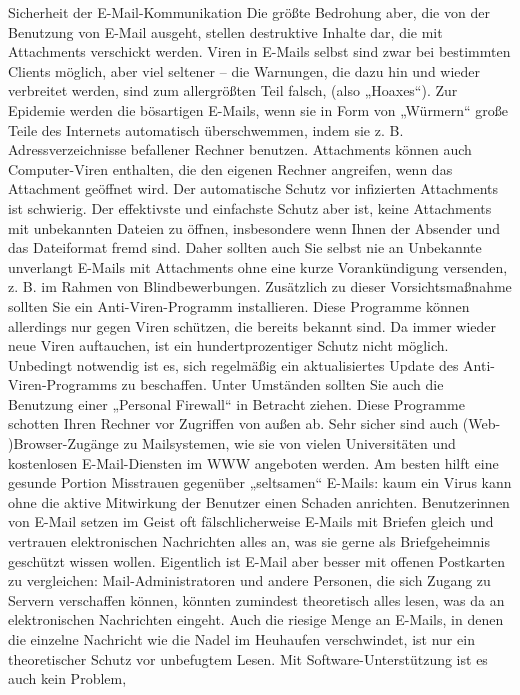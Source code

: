 \documentclass[]{book}
\theoremstyle{definition}
\theoremstyle{definition}
\theoremstyle{definition}
\theoremstyle{remark}
\begin{document}
Sicherheit der E-Mail-Kommunikation Die größte Bedrohung aber, die von
der Benutzung von E-Mail ausgeht, stellen destruktive Inhalte dar, die
mit Attachments verschickt werden. Viren in E-Mails selbst sind zwar bei
bestimmten Clients möglich, aber viel seltener -- die Warnungen, die
dazu hin und wieder verbreitet werden, sind zum allergrößten Teil
falsch, (also „Hoaxes``). Zur Epidemie werden die bösartigen E-Mails,
wenn sie in Form von „Würmern`` große Teile des Internets automatisch
überschwemmen, indem sie z. B. Adressverzeichnisse befallener Rechner
benutzen. Attachments können auch Computer-Viren enthalten, die den
eigenen Rechner angreifen, wenn das Attachment geöffnet wird. Der
automatische Schutz vor infizierten Attachments ist schwierig. Der
effektivste und einfachste Schutz aber ist, keine Attachments mit
unbekannten Dateien zu öffnen, insbesondere wenn Ihnen der Absender und
das Dateiformat fremd sind. Daher sollten auch Sie selbst nie an
Unbekannte unverlangt E-Mails mit Attachments ohne eine kurze
Vorankündigung versenden, z. B. im Rahmen von Blindbewerbungen.
Zusätzlich zu dieser Vorsichtsmaßnahme sollten Sie ein
Anti-Viren-Programm installieren. Diese Programme können allerdings nur
gegen Viren schützen, die bereits bekannt sind. Da immer wieder neue
Viren auftauchen, ist ein hundertprozentiger Schutz nicht möglich.
Unbedingt notwendig ist es, sich regelmäßig ein aktualisiertes Update
des Anti-Viren-Programms zu beschaffen. Unter Umständen sollten Sie auch
die Benutzung einer „Personal Firewall`` in Betracht ziehen. Diese
Programme schotten Ihren Rechner vor Zugriffen von außen ab. Sehr sicher
sind auch (Web- )Browser-Zugänge zu Mailsystemen, wie sie von vielen
Universitäten und kostenlosen E-Mail-Diensten im WWW angeboten werden.
Am besten hilft eine gesunde Portion Misstrauen gegenüber „seltsamen``
E-Mails: kaum ein Virus kann ohne die aktive Mitwirkung der Benutzer
einen Schaden anrichten. Benutzerinnen von E-Mail setzen im Geist oft
fälschlicherweise E-Mails mit Briefen gleich und vertrauen
elektronischen Nachrichten alles an, was sie gerne als Briefgeheimnis
geschützt wissen wollen. Eigentlich ist E-Mail aber besser mit offenen
Postkarten zu vergleichen: Mail-Administratoren und andere Personen, die
sich Zugang zu Servern verschaffen können, könnten zumindest theoretisch
alles lesen, was da an elektronischen Nachrichten eingeht. Auch die
riesige Menge an E-Mails, in denen die einzelne Nachricht wie die Nadel
im Heuhaufen verschwindet, ist nur ein theoretischer Schutz vor
unbefugtem Lesen. Mit Software-Unterstützung ist es auch kein Problem,
\end{document}
